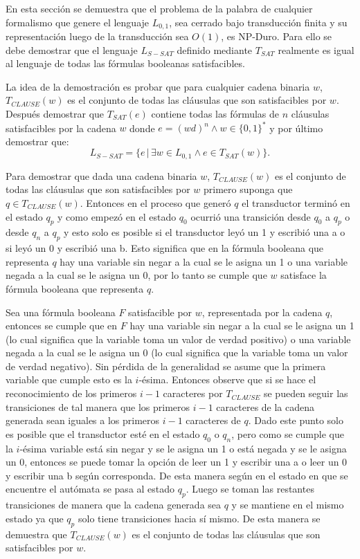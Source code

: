 \documentclass[12pt]{article}
\begin{document}
En esta sección se demuestra que el problema de la palabra de cualquier formalismo que genere el lenguaje 
$L_{0,1}$, sea cerrado bajo transducción finita y su representación luego de la transducción sea $O(1)$, es NP-Duro. Para ello se debe demostrar que el lenguaje 
$L_{S-SAT}$ definido mediante $T_{SAT}$ realmente es igual al lenguaje de todas las fórmulas booleanas satisfacibles.

La idea de la demostración es probar que para cualquier cadena binaria $w$, $T_{CLAUSE}(w)$ es el conjunto de todas las cláusulas que son satisfacibles por $w$.
Después demostrar que $T_{SAT}(e)$ contiene todas las fórmulas de $n$ cláusulas satisfacibles por la cadena $w$ donde $e=(wd)^n \wedge w\in\{0,1\}^*$ y por último demostrar que:
$$L_{S-SAT} = \{e\,|\,\exists w \in L_{0,1} \wedge e \in T_{SAT}(w) \}.$$

Para demostrar que dada una cadena binaria $w$, $T_{CLAUSE}(w)$ es el conjunto de todas las cláusulas que son 
satisfacibles por $w$ primero suponga que $q\in T_{CLAUSE}(w)$. Entonces en el proceso que generó $q$ el 
transductor terminó en el estado $q_p$ y como empezó en el estado $q_0$ ocurrió una transición desde $q_0$
a $q_p$ o desde $q_n$ a $q_p$ y esto solo es posible si el transductor leyó un 1 y escribió una a o si leyó un 
0 y escribió una b. Esto significa que en la fórmula booleana que representa $q$ hay una variable sin negar a 
la cual se le asigna un 1 o una variable negada a la cual se le asigna un 0, por lo tanto se cumple que $w$
satisface la fórmula booleana que representa $q$.

Sea una fórmula booleana $F$ satisfacible por $w$, representada por la cadena $q$, entonces se cumple que en 
$F$ hay una variable sin negar a la cual se le asigna un 1 (lo cual significa que la variable toma
un valor de verdad positivo) o una variable 
negada a la cual se le asigna un 0 (lo cual significa que la variable toma
un valor de verdad negativo). Sin pérdida de la generalidad se asume que la primera variable que cumple esto es la $i$-ésima.  
Entonces observe que si se hace el reconocimiento de los primeros $i-1$ caracteres por $T_{CLAUSE}$ se pueden 
seguir las transiciones de tal manera que los primeros $i-1$ caracteres de la cadena generada sean iguales a 
los primeros $i-1$ caracteres de $q$. Dado este punto solo es posible que el transductor esté en el estado 
$q_0$ o $q_n$, pero como se cumple que la $i$-ésima variable está sin negar y se le asigna un 1 o está negada 
y se le asigna un 0, entonces se puede tomar la opción de leer un 1 y escribir una a o leer un 0 y escribir 
una b según corresponda. De esta manera según en el estado en que se encuentre el autómata se pasa al estado $q_p$. 
Luego se toman las restantes transiciones de manera que la cadena generada sea $q$ y se mantiene en el mismo estado ya que $q_p$ solo tiene transiciones hacia sí mismo. De esta manera se demuestra que $T_{CLAUSE}(w)$ es el conjunto de todas las cláusulas que son satisfacibles por $w$.
\end{document}
